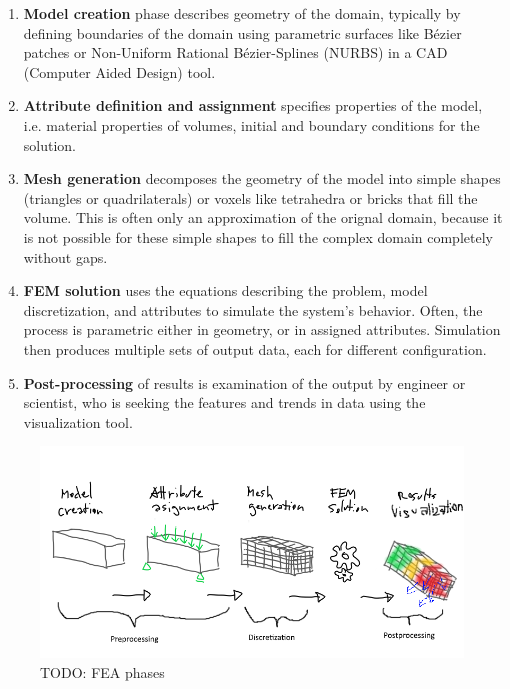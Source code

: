 \begin{enumerate}
    \item \textbf{Model creation} phase describes geometry of the domain, typically by defining boundaries of the domain using parametric surfaces like Bézier patches or Non-Uniform Rational Bézier-Splines (NURBS) \cite{XXX} in a CAD (Computer Aided Design) tool.
    \item \textbf{Attribute definition and assignment} specifies properties of the model, i.e. material properties of volumes, initial and boundary conditions for the solution.
    \item \textbf{Mesh generation} decomposes the geometry of the model into simple shapes (triangles or quadrilaterals) or voxels like tetrahedra or bricks that fill the volume. This is often only an approximation of the orignal domain, because it is not possible for these simple shapes to fill the complex domain completely without gaps.
    \item \textbf{FEM solution} uses the equations describing the problem, model discretization, and attributes to simulate the system's behavior. Often, the process is parametric either in geometry, or in assigned attributes. Simulation then produces multiple sets of output data, each for different configuration.
    \item \textbf{Post-processing} of results is examination of the output by engineer or scientist, who is seeking the features and trends in data using the visualization tool.
\end{enumerate}

\begin{figure}[H]
    \centering
    \includegraphics[width=\textwidth]{figures/chapter-introduction/FEA-phases}
    \decoRule
    \caption[TODO: ]{TODO: FEA phases}
    \label{fig:FEA-phases}
\end{figure}

